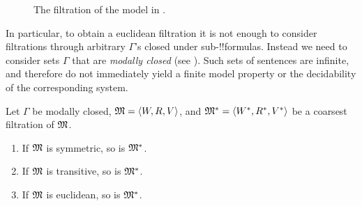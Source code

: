 \documentclass[../../../include/open-logic-section]{subfiles}
\begin{document}
\begin{figure}[ht]
  \centering
  \caption{The filtration of the model in .}
\end{figure}

In particular, to obtain a euclidean filtration it is not enough to
consider filtrations through arbitrary $\Gamma$'s closed under
sub-!!{formula}s. Instead we need to consider sets $\Gamma$ that are
\emph{modally closed} (see ). Such sets
of sentences are infinite, and therefore do not immediately yield a
finite model property or the decidability of the corresponding system.

\begin{thm}
  Let $\Gamma$ be modally closed, $\mModel{M}=\tuple{W,R,V}$, and
  $\mModel{M^*} = \tuple{W^*,R^*,V^*}$ be a coarsest filtration of
  $\mModel{M}$.
  \begin{enumerate}
  \item If $\mModel{M}$ is symmetric, so is $\mModel{M^*}$.
  \item If $\mModel{M}$ is transitive, so is $\mModel{M^*}$.
  \item If $\mModel{M}$ is euclidean, so is $\mModel{M^*}$.
  \end{enumerate}
\end{thm}
\end{document}
